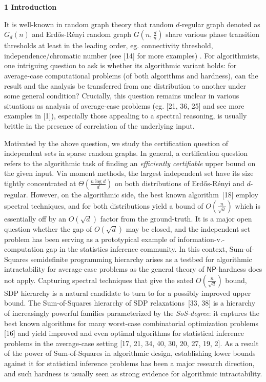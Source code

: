 

\par\medskip\noindent\textbf{
1 Introduction}\par




It is well-known in random graph theory that random $d$-regular graph denoted as $G_{d}(n)$ and Erdős-Rényi random graph $G(n,\frac{d}{n})$ share various phase transition thresholds at least in the leading order, eg. connectivity threshold, independence/chromatic number (see [14] for more examples) . For algorithmists,
one intriguing question to ask is whether its algorithmic variant holds: for average-case computational problems (of both algorithms and hardness),
can the result and the analysis be transferred from one distribution to another under some general condition?
Crucially, this question remains unclear in various situations as analysis of average-case problems (eg. [21, 36, 25] and see more examples in [1]), especially those appealing to a spectral reasoning, is usually brittle in the presence of correlation of the underlying input.\par




Motivated by the above question, we study the certification question of independent sets in sparse random graphs. In general, a certification question refers to the algorithmic task of finding an
\emph{efficiently certifiable} upper bound on the given input. Via moment methods, the largest independent set have its size tightly concentrated at $\Theta(\frac{n\log d}{d})$ on both distributions of Erdős-Rényi and $d$-regular. However, on the algorithmic side, the best known algorithm [18] employ spectral techniques, and for both distributions yield a bound of $O(\frac{n}{\sqrt{d}})$ which is essentially off by an $O(\sqrt{d})$ factor from the ground-truth. It is a major open question whether the gap of $O(\sqrt{d})$ may be closed, and the independent set problem has been serving as a prototypical example of information-v.-computation gap in the statistics inference community. In this context, Sum-of-Squares semidefinite programming hierarchy arises as a testbed for algorithmic intractability for average-case problems as the general theory of $\mathsf{NP}$-hardness does not apply. Capturing spectral techniques that give the sated $O(\frac{n}{\sqrt{d}})$ bound, SDP hierarchy is a natural candidate to turn to for a possibly improved upper bound. The Sum-of-Squares hierarchy of SDP relaxations [33, 38] is a hierarchy of increasingly powerful families parameterized by the \emph{SoS-degree}: it captures the best known algorithms for many worst-case combinatorial optimization problems [16] and yield improved and even optimal algorithms for statistical inference problems in the average-case setting [17, 21, 34, 40, 30, 20, 27, 19, 2]. As a result of the power of Sum-of-Squares in algorithmic design, establishing lower bounds against it for statistical inference problems has been a major research direction, and such hardness is usually seen as strong evidence for algorithmic intractability.\par




